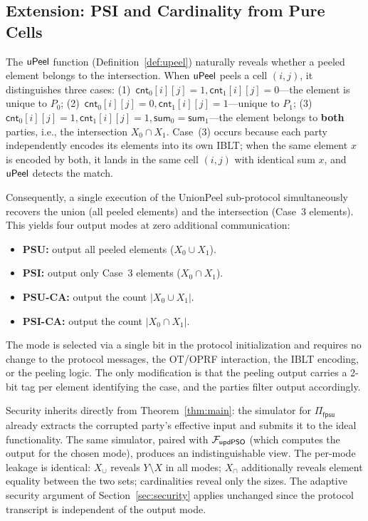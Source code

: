\documentclass[letterpaper,twocolumn,10pt]{article}
\theoremstyle{definition}
\begin{document}

\subsection{Extension: PSI and Cardinality from Pure Cells}

The $\mathsf{uPeel}$ function (Definition~\ref{def:upeel}) naturally reveals whether a
peeled element belongs to the intersection. When $\mathsf{uPeel}$ peels a cell
$(i,j)$, it distinguishes three cases: (1)~$\mathsf{cnt}_0[i][j]=1,
\mathsf{cnt}_1[i][j]=0$---the element is unique to $P_0$;
(2)~$\mathsf{cnt}_0[i][j]=0, \mathsf{cnt}_1[i][j]=1$---unique to $P_1$;
(3)~$\mathsf{cnt}_0[i][j]=1, \mathsf{cnt}_1[i][j]=1, \mathsf{sum}_0=
\mathsf{sum}_1$---the element belongs to \textbf{both} parties, i.e., the
intersection $X_0 \cap X_1$. Case~(3) occurs because each party independently
encodes its elements into its own IBLT; when the same element $x$ is encoded
by both, it lands in the same cell $(i,j)$ with identical sum $x$, and
$\mathsf{uPeel}$ detects the match.

Consequently, a single execution of the UnionPeel sub-protocol simultaneously
recovers the union (all peeled elements) and the intersection (Case~3
elements). This yields four output modes at zero additional communication:
\begin{itemize}
\item \textbf{PSU:} output all peeled elements ($X_0 \cup X_1$).
\item \textbf{PSI:} output only Case~3 elements ($X_0 \cap X_1$).
\item \textbf{PSU-CA:} output the count $|X_0 \cup X_1|$.
\item \textbf{PSI-CA:} output the count $|X_0 \cap X_1|$.
\end{itemize}

The mode is selected via a single bit in the protocol initialization and
requires no change to the protocol messages, the OT/OPRF interaction, the
IBLT encoding, or the peeling logic. The only modification is that the
peeling output carries a 2-bit tag per element identifying the case, and the
parties filter output accordingly.

Security inherits directly from Theorem~\ref{thm:main}: the simulator for
$\Pi_{\mathsf{fpsu}}$ already extracts the corrupted party's effective input
and submits it to the ideal functionality. The same simulator, paired with
$\mathcal{F}_{\mathsf{updPSO}}$ (which computes the output for the chosen mode),
produces an indistinguishable view. The per-mode leakage is identical:
$X_\cup$ reveals $Y \setminus X$ in all modes; $X_\cap$ additionally reveals
element equality between the two sets; cardinalities reveal only the sizes.
The adaptive security argument of Section~\ref{sec:security} applies
unchanged since the protocol transcript is independent of the output mode.
\end{document}
